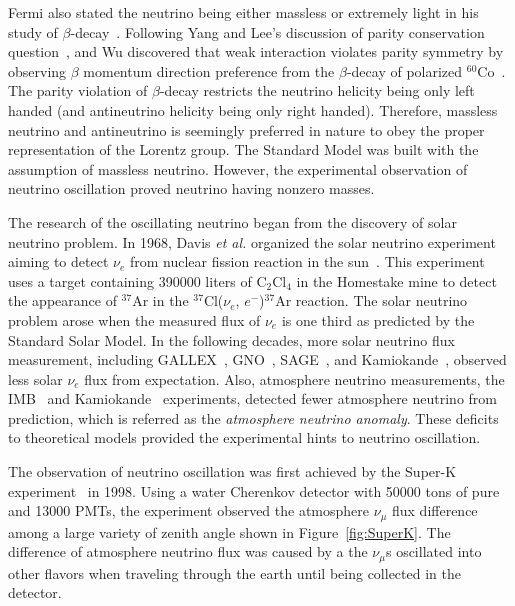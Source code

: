     Fermi also stated the neutrino being either massless or extremely light in his study of $\beta$-decay~\cite{bib:Fermi}.
    Following Yang and Lee's discussion of parity conservation question~\cite{bib:YangLee}, and Wu discovered that weak interaction violates parity symmetry by observing $\beta$ momentum direction preference from the $\beta$-decay of polarized $^{60}$Co~\cite{bib:Wu}.
    The parity violation of $\beta$-decay restricts the neutrino helicity being only left handed (and antineutrino helicity being only right handed).
    Therefore, massless neutrino and antineutrino is seemingly preferred in nature to obey the proper representation of the Lorentz group.
    The Standard Model was built with the assumption of massless neutrino.
    However, the experimental observation of neutrino oscillation proved neutrino having nonzero masses.

    The research of the oscillating neutrino began from the discovery of solar neutrino problem. 
    In 1968, Davis \textit{et al.} organized the solar neutrino experiment aiming to detect $\nu_e$ from nuclear fission reaction in the sun~\cite{bib:davis}.
    This experiment uses a target containing 390000 liters of C$_2$Cl$_4$ in the Homestake mine to detect the appearance of $^{37}$Ar in the $^{37}$Cl($\nu_e$, $e^-$)$^{37}$Ar reaction.
    The solar neutrino problem arose when the measured flux of $\nu_e$ is one third as predicted by the Standard Solar Model.
    In the following decades, more solar neutrino flux measurement, including GALLEX~\cite{bib:GALLEX}, GNO~\cite{bib:GNO}, SAGE~\cite{bib:SAGE}, and Kamiokande~\cite{bib:kamioka1996}, observed less solar $\nu_e$ flux from expectation.
    Also, atmosphere neutrino measurements, the IMB~\cite{bib:IMB} and Kamiokande~\cite{bib:Kamioka1986} experiments, detected fewer atmosphere neutrino from prediction, which is referred as the \textit{atmosphere neutrino anomaly}.
    These deficits to theoretical models provided the experimental hints to neutrino oscillation. 
    
    The observation of neutrino oscillation was first achieved by the Super-K experiment~\cite{bib:SuperK} in 1998. 
    Using a water Cherenkov detector with 50000 tons of pure and 13000 PMTs, the experiment observed the atmosphere $\nu_\mu$ flux difference among a large variety of zenith angle shown in Figure~\ref{fig:SuperK}.
    The difference of atmosphere neutrino flux was caused by a the $\nu_\mu$s oscillated into other flavors when traveling through the earth until being collected in the detector.
    
